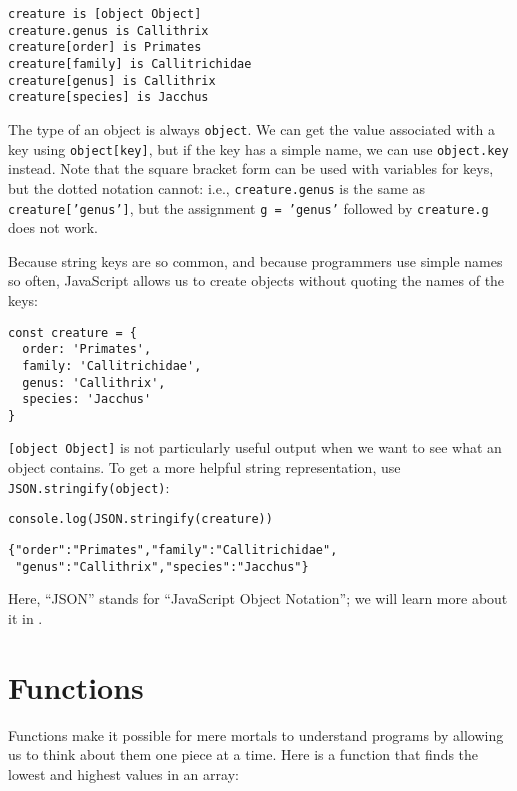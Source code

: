 \begin{verbatim}
creature is [object Object]
creature.genus is Callithrix
creature[order] is Primates
creature[family] is Callitrichidae
creature[genus] is Callithrix
creature[species] is Jacchus
\end{verbatim}

The type of an object is always \texttt{object}.
We can get the value associated with a key using \texttt{object[key]},
but if the key has a simple name,
we can use \texttt{object.key} instead.
Note that the square bracket form can be used with variables for keys,
but the dotted notation cannot:
i.e.,
\texttt{creature.genus} is the same as \texttt{creature['genus']},
but the assignment \texttt{g\ =\ 'genus'} followed by \texttt{creature.g} does not work.

Because string keys are so common,
and because programmers use simple names so often,
JavaScript allows us to create objects without quoting the names of the keys:

\begin{verbatim}
const creature = {
  order: 'Primates',
  family: 'Callitrichidae',
  genus: 'Callithrix',
  species: 'Jacchus'
}
\end{verbatim}

\texttt{[object\ Object]} is not particularly useful output when we want to see what an object contains.
To get a more helpful string representation,
use \texttt{JSON.stringify(object)}:

\begin{verbatim}
console.log(JSON.stringify(creature))
\end{verbatim}

\begin{verbatim}
{"order":"Primates","family":"Callitrichidae",
 "genus":"Callithrix","species":"Jacchus"}
\end{verbatim}

Here,
``JSON'' stands for ``JavaScript Object Notation'';
we will learn more about it in .

\section{Functions}\label{s:basics-functions}

Functions make it possible for mere mortals to understand programs
by allowing us to think about them one piece at a time.
Here is a function that finds the lowest and highest values in an array:

